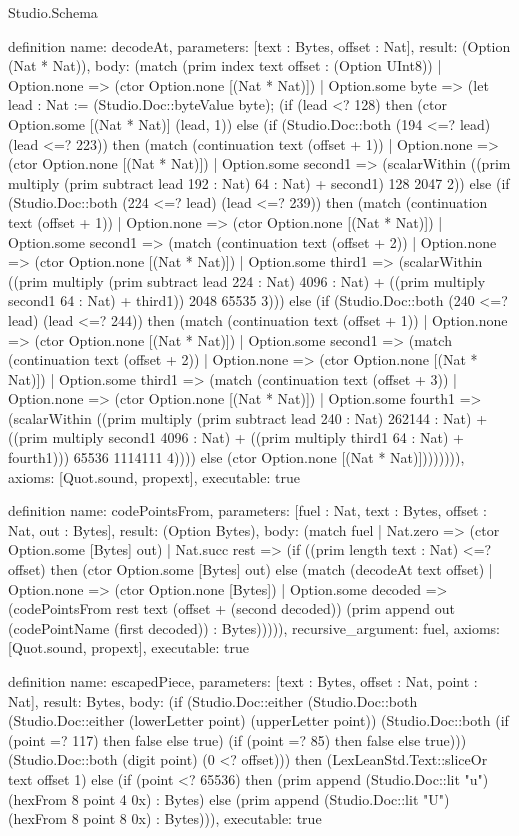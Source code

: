 \begin{lexlean}{Studio.Schema}
\begin{semanticmodule}
definition{
  name: decodeAt,
  parameters: [text : Bytes, offset : Nat],
  result: (Option (Nat * Nat)),
  body: (match (prim index text offset : (Option UInt8))
    | Option.none => (ctor Option.none [(Nat * Nat)])
    | Option.some byte => (let lead : Nat := (Studio.Doc::byteValue byte); (if (lead <? 128) then (ctor Option.some [(Nat * Nat)] (lead, 1)) else (if (Studio.Doc::both (194 <=? lead) (lead <=? 223)) then (match (continuation text (offset + 1))
      | Option.none => (ctor Option.none [(Nat * Nat)])
      | Option.some second1 => (scalarWithin ((prim multiply (prim subtract lead 192 : Nat) 64 : Nat) + second1) 128 2047 2)) else (if (Studio.Doc::both (224 <=? lead) (lead <=? 239)) then (match (continuation text (offset + 1))
      | Option.none => (ctor Option.none [(Nat * Nat)])
      | Option.some second1 => (match (continuation text (offset + 2))
        | Option.none => (ctor Option.none [(Nat * Nat)])
        | Option.some third1 => (scalarWithin ((prim multiply (prim subtract lead 224 : Nat) 4096 : Nat) + ((prim multiply second1 64 : Nat) + third1)) 2048 65535 3))) else (if (Studio.Doc::both (240 <=? lead) (lead <=? 244)) then (match (continuation text (offset + 1))
      | Option.none => (ctor Option.none [(Nat * Nat)])
      | Option.some second1 => (match (continuation text (offset + 2))
        | Option.none => (ctor Option.none [(Nat * Nat)])
        | Option.some third1 => (match (continuation text (offset + 3))
          | Option.none => (ctor Option.none [(Nat * Nat)])
          | Option.some fourth1 => (scalarWithin ((prim multiply (prim subtract lead 240 : Nat) 262144 : Nat) + ((prim multiply second1 4096 : Nat) + ((prim multiply third1 64 : Nat) + fourth1))) 65536 1114111 4)))) else (ctor Option.none [(Nat * Nat)]))))))),
  axioms: [Quot.sound, propext],
  executable: true
}

definition{
  name: codePointsFrom,
  parameters: [fuel : Nat, text : Bytes, offset : Nat, out : Bytes],
  result: (Option Bytes),
  body: (match fuel
    | Nat.zero => (ctor Option.some [Bytes] out)
    | Nat.succ rest => (if ((prim length text : Nat) <=? offset) then (ctor Option.some [Bytes] out) else (match (decodeAt text offset)
      | Option.none => (ctor Option.none [Bytes])
      | Option.some decoded => (codePointsFrom rest text (offset + (second decoded)) (prim append out (codePointName (first decoded)) : Bytes))))),
  recursive_argument: fuel,
  axioms: [Quot.sound, propext],
  executable: true
}

definition{
  name: escapedPiece,
  parameters: [text : Bytes, offset : Nat, point : Nat],
  result: Bytes,
  body: (if (Studio.Doc::either (Studio.Doc::both (Studio.Doc::either (lowerLetter point) (upperLetter point)) (Studio.Doc::both (if (point =? 117) then false else true) (if (point =? 85) then false else true))) (Studio.Doc::both (digit point) (0 <? offset))) then (LexLeanStd.Text::sliceOr text offset 1) else (if (point <? 65536) then (prim append (Studio.Doc::lit "u") (hexFrom 8 point 4 0x) : Bytes) else (prim append (Studio.Doc::lit "U") (hexFrom 8 point 8 0x) : Bytes))),
  executable: true
}


\end{semanticmodule}
\end{lexlean}
